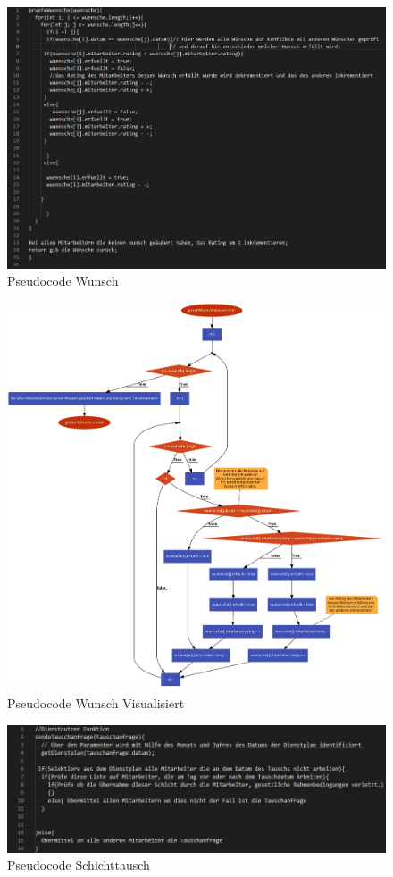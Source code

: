 \documentclass[11pt,
paper=a4,
bibtotocnumbered,	  %
liststotocnumbered,  %
DIV=calc,		  %
tablecaptionabove,	  %
headinclude,
]{article}
\begin{document}
\begin{figure}[H]
\includegraphics[width=1\textwidth]{Bilder/pseudoW.jpg}
\caption{Pseudocode Wunsch}
\end{figure}
\begin{figure}[H]
\includegraphics[width=1\textwidth]{Bilder/WuenschePseudo.png}
\caption{Pseudocode Wunsch Visualisiert}
\end{figure}
\begin{figure}[H]
\includegraphics[width=1\textwidth]{Bilder/pseudoT.jpg}
\caption{Pseudocode Schichttausch}
\end{figure}
\end{document}
